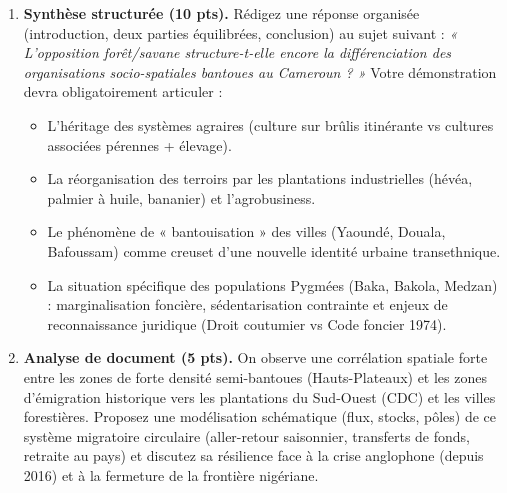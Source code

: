 \documentclass[11pt]{article}
\begin{document}
\begin{exercice}
\begin{enumerate}
    \item \textbf{Synthèse structurée (10 pts).} Rédigez une réponse organisée (introduction, deux parties équilibrées, conclusion) au sujet suivant : 
    \textit{« L'opposition forêt/savane structure-t-elle encore la différenciation des organisations socio-spatiales bantoues au Cameroun ? »}
    Votre démonstration devra obligatoirement articuler :
    \begin{itemize}
        \item L'héritage des systèmes agraires (culture sur brûlis itinérante vs cultures associées pérennes + élevage).
        \item La réorganisation des terroirs par les plantations industrielles (hévéa, palmier à huile, bananier) et l'agrobusiness.
        \item Le phénomène de « bantouisation » des villes (Yaoundé, Douala, Bafoussam) comme creuset d'une nouvelle identité urbaine transethnique.
        \item La situation spécifique des populations Pygmées (Baka, Bakola, Medzan) : marginalisation foncière, sédentarisation contrainte et enjeux de reconnaissance juridique (Droit coutumier vs Code foncier 1974).
    \end{itemize}

    \item \textbf{Analyse de document (5 pts).} On observe une corrélation spatiale forte entre les zones de forte densité semi-bantoues (Hauts-Plateaux) et les zones d'émigration historique vers les plantations du Sud-Ouest (CDC) et les villes forestières. Proposez une modélisation schématique (flux, stocks, pôles) de ce système migratoire circulaire (aller-retour saisonnier, transferts de fonds, retraite au pays) et discutez sa résilience face à la crise anglophone (depuis 2016) et à la fermeture de la frontière nigériane.
\end{enumerate}
\end{exercice}
\end{document}
